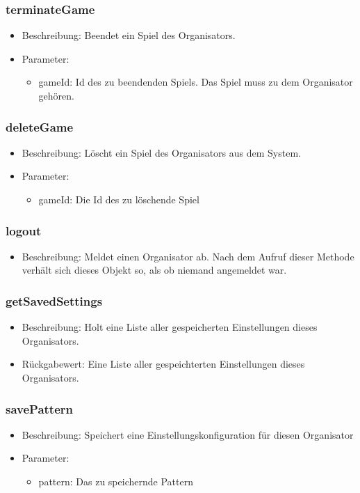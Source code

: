 \documentclass[a4paper]{scrreprt}
\begin{document}
    \subsubsection{terminateGame}
    \begin{itemize}
        \item Beschreibung: Beendet ein Spiel des Organisators. 
        \item Parameter:
        \begin{itemize}
            \item gameId: Id des zu beendenden Spiels. Das Spiel muss zu dem Organisator gehören.
        \end{itemize}
    \end{itemize}
    \subsubsection{deleteGame}
    \begin{itemize}
        \item Beschreibung: Löscht ein Spiel des Organisators aus dem System. 
        \item Parameter:
        \begin{itemize}
            \item gameId: Die Id des zu löschende Spiel
        \end{itemize}
    \end{itemize}
    \subsubsection{logout}
    \begin{itemize}
        \item Beschreibung: Meldet einen Organisator ab. Nach dem Aufruf dieser Methode verhält sich dieses Objekt so, als ob niemand angemeldet war.
    \end{itemize}
    \subsubsection{getSavedSettings}
    \begin{itemize}
        \item Beschreibung: Holt eine Liste aller gespeicherten Einstellungen dieses Organisators.
        \item Rückgabewert: Eine Liste aller gespeichterten Einstellungen dieses Organisators. 
    \end{itemize}
    \subsubsection{savePattern}
    \begin{itemize}
        \item Beschreibung: Speichert eine Einstellungskonfiguration für diesen Organisator
        \item Parameter:
        \begin{itemize}
            \item pattern: Das zu speichernde Pattern
        \end{itemize}
    \end{itemize}
\end{document}
